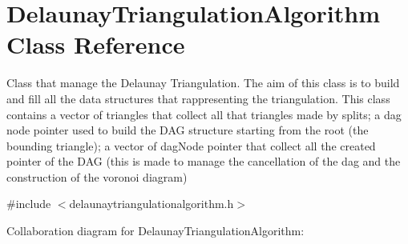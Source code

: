 \hypertarget{classDelaunayTriangulationAlgorithm}{}\section{Delaunay\+Triangulation\+Algorithm Class Reference}
\label{classDelaunayTriangulationAlgorithm}


Class that manage the Delaunay Triangulation. The aim of this class is to build and fill all the data structures that rappresenting the triangulation. This class contains a vector of triangles that collect all that triangles made by splits; a dag node pointer used to build the D\+AG structure starting from the root (the bounding triangle); a vector of dag\+Node pointer that collect all the created pointer of the D\+AG (this is made to manage the cancellation of the dag and the construction of the voronoi diagram)  




{\ttfamily \#include $<$delaunaytriangulationalgorithm.\+h$>$}



Collaboration diagram for Delaunay\+Triangulation\+Algorithm\+:
